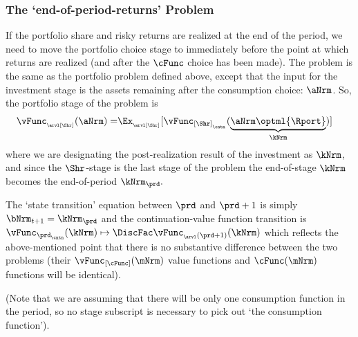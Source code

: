\documentclass[\econtexRoot/SolvingMicroDSOPs]{subfiles}
\begin{document}
\subsubsection{The `end-of-period-returns' Problem}

If the portfolio share and risky returns are realized at the end of the {period}, we need to move the portfolio choice {stage} to immediately before the point at which returns are realized (and after the $\cFunc$ choice has been made).  The problem is the same as the portfolio problem defined above, except that the input for the investment {stage} is the assets remaining after the consumption choice: $\aNrm$.  So, the portfolio {stage} of the problem is
\begin{equation}\begin{gathered}\begin{aligned}
  \vFunc_{_\arvl[\Shr]}(\aNrm) = & \Ex_{_\arvl[\Shr]}[\vFunc_{[\Shr]_{_\cntn}}(\underbrace{\aNrm\optml{\Rport}}_{\kNrm})] %
    \end{aligned}\end{gathered}\end{equation}
where we are designating the post-realization result of the investment as $\kNrm$, and since the $\Shr$-{stage} is the last {stage} of the problem the end-of-{stage} $\kNrm$ becomes the end-of-{period} $\kNrm_{\prd}.$ 

The `state transition' equation between $\prd$ and $\prd+1$ is simply $\bNrm_{t+1} = \kNrm_{\prd}$ and the continuation-value function transition is $\vFunc_{\prd_\cntn}(\kNrm) \mapsto \DiscFac \vFunc_{_\arvl(\prd+1)}(\kNrm)$ which reflects the above-mentioned point that there is no substantive difference between the two problems (their $\vFunc_{[\cFunc]}(\mNrm)$ value functions and $\cFunc(\mNrm)$ functions will be identical).

(Note that we are assuming that there will be only one consumption function in the period, so no {stage} subscript is necessary to pick out `the consumption function'). 
\end{document}
